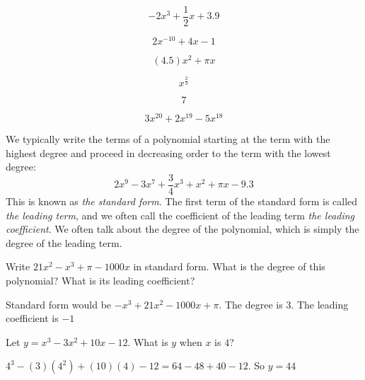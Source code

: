 \begin{Answer}[ref=findpolynomials]
\begin{multicols}{3}
  \begin{equation*}
    \boxed{-2 x^3 + \frac{1}{2}x + 3.9}
  \end{equation*}

  \begin{equation*}
    2 x^{-10} + 4x - 1
  \end{equation*}

  \begin{equation*}
    \boxed{(4.5)x^2 + \pi x}
  \end{equation*}

  \begin{equation*}
    x^{\frac{2}{3}}
  \end{equation*}

  \begin{equation*}
   \boxed{7}
  \end{equation*}

  \begin{equation*}
    \boxed{3x^{20} + 2x^{19} -5 x^{18}}
  \end{equation*}
\end{multicols}

\end{Answer}

We typically write the terms of a polynomial starting at
the term with the highest degree and proceed in decreasing order to the term with the lowest degree:
\begin{equation*}
2 x^9 - 3x^7 + \frac{3}{4}x^3 + x^2 + \pi x -9.3
\end{equation*}
This is known as \emph{the standard form}.  The first term of the
standard form is called \emph{the leading term}, and we often call the
coefficient of the leading term \emph{the leading coefficient}.  We
often talk about the degree of the polynomial, which is simply the
degree of the leading term.

\begin{Exercise}[title={Standard of a Polynomial}, label=polynomialstandardform]
  Write $21x^2 - x^3 + \pi - 1000x$ in standard form. What is the degree of this polynomial? What is its leading coefficient?
\end{Exercise}
\begin{Answer}[ref=polynomialstandardform]
  Standard form would be $-x^3 + 21x^2 - 1000x + \pi$. The degree is 3. The leading coefficient is $-1$
\end{Answer}

\begin{Exercise}[title={Evaluate a Polynomial}, label=evaluatepolynomial]
  Let $y = x^3 - 3x^2 + 10x - 12$. What is $y$ when $x$ is $4$?
\end{Exercise}
\begin{Answer}[ref=evaluatepolynomial]
  $4^3 - (3)(4^2) + (10)(4) - 12 = 64 - 48 + 40 - 12$. So $y = 44$ 
\end{Answer}

